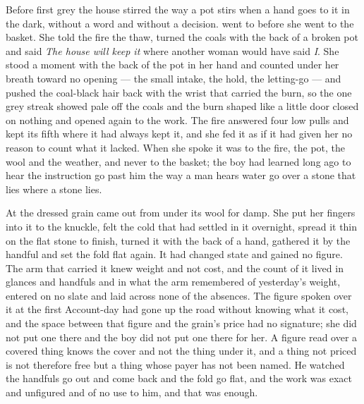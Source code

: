 \scenebreak

Before first grey the house stirred the way a pot stirs when a hand goes to it in the dark, without a word and without a decision.  went to  before she went to the basket. She told the fire the thaw, turned the coals with the back of a broken pot and said \emph{The house will keep it} where another woman would have said \emph{I}. She stood a moment with the back of the pot in her hand and counted under her breath toward no opening --- the small intake, the hold, the letting-go --- and pushed the coal-black hair back with the wrist that carried the burn, so the one grey streak showed pale off the coals and the burn shaped like a little door closed on nothing and opened again to the work. The fire answered four low pulls and kept its fifth where it had always kept it, and she fed it as if it had given her no reason to count what it lacked. When she spoke it was to the fire, the pot, the wool and the weather, and never to the basket; the boy had learned long ago to hear the instruction go past him the way a man hears water go over a stone that lies where a stone lies.

At  the dressed grain came out from under its wool for damp. She put her fingers into it to the knuckle, felt the cold that had settled in it overnight, spread it thin on the flat stone to finish, turned it with the back of a hand, gathered it by the handful and set the fold flat again. It had changed state and gained no figure. The arm that carried it knew weight and not cost, and the count of it lived in glances and handfuls and in what the arm remembered of yesterday's weight, entered on no slate and laid across none of the absences. The figure spoken over it at the first Account-day had gone up the road without knowing what it cost, and the space between that figure and the grain's price had no signature; she did not put one there and the boy did not put one there for her. A figure read over a covered thing knows the cover and not the thing under it, and a thing not priced is not therefore free but a thing whose payer has not been named. He watched the handfuls go out and come back and the fold go flat, and the work was exact and unfigured and of no use to him, and that was enough.

